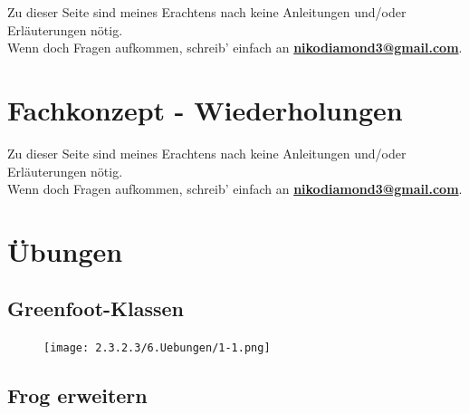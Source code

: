 \documentclass{scrartcl}   %
\begin{document}
Zu dieser Seite sind meines Erachtens nach keine Anleitungen und/oder Erläuterungen nötig.\\
Wenn doch Fragen aufkommen, schreib' einfach an \textbf{\href{mailto:nikodiamond3@gmail.com}{nikodiamond3@gmail.com}}.

\newpage

\section{Fachkonzept - Wiederholungen}

Zu dieser Seite sind meines Erachtens nach keine Anleitungen und/oder Erläuterungen nötig.\\
Wenn doch Fragen aufkommen, schreib' einfach an \textbf{\href{mailto:nikodiamond3@gmail.com}{nikodiamond3@gmail.com}}.

\newpage

\section{Übungen}

\subsection{Greenfoot-Klassen}

\begin{figure}[ht]
    \centering
	\texttt{[image: 2.3.2.3/6.Uebungen/1-1.png]}
\end{figure}

\newpage

\subsection{Frog erweitern}
\end{document}

